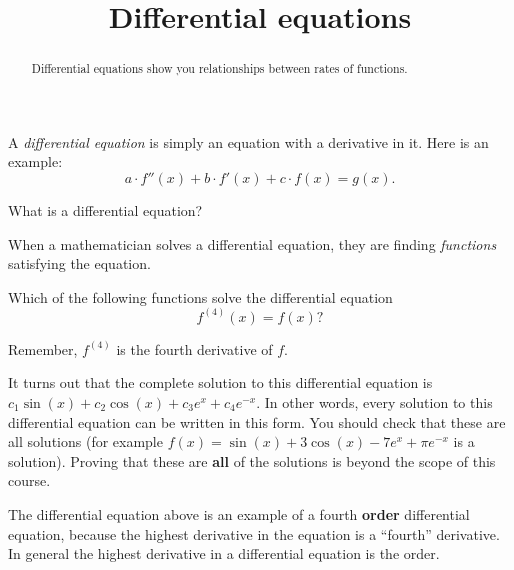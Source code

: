 \documentclass{ximera}
\title[Dig-In:]{Differential equations}
\begin{document}
\begin{abstract}
  Differential equations show you relationships between rates of
  functions.
\end{abstract}
\maketitle

A \textit{differential equation} is
simply an equation with a derivative in it. Here is an example:
\[
a\cdot f''(x) + b\cdot f'(x) + c\cdot f(x) = g(x). 
\]
\begin{question}
  What is a differential equation?
  \begin{multipleChoice}
  \end{multipleChoice}
\end{question}

When a mathematician solves a differential equation, they are finding
\textit{functions} satisfying the equation.
\begin{question}
  Which of the following functions solve the differential equation
  \[
  f^{(4)}(x) = f(x)?
  \]
  \begin{hint}
    Remember, $f^{(4)}$ is the fourth derivative of $f$.
  \end{hint}
  \begin{selectAll}
  \end{selectAll}
  \begin{feedback}
    It turns out that the complete solution to this differential equation
    is $c_1\sin(x)+c_2\cos(x)+c_3e^x+c_4e^{-x}$.  In other words, every
    solution to this differential equation can be written in this form.
    You should check that these are all solutions (for example $f(x) =
    \sin(x)+3\cos(x)-7e^x+\pi e^{-x}$ is a solution).  Proving that these
    are \textbf{all} of the solutions is beyond the scope of this course.
  \end{feedback}
\end{question}


The differential equation above is an example of a fourth \textbf{order}
differential equation, because the highest derivative in the equation
is a ``fourth'' derivative. In general the highest derivative in a
differential equation is the order.
\end{document}
